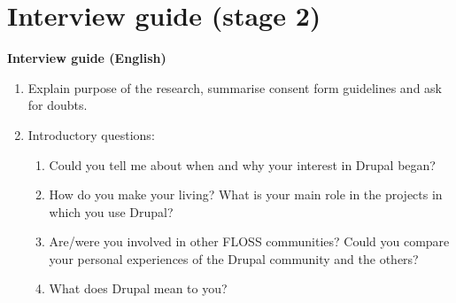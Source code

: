 \chapter{Interview guide (stage 2)}
\label{appendix-interview-guide-stage-2}

\newpage
	
\hrulefill\par

\begin{center}
\textbf{Interview guide (English)}
\end{center}

\begin{enumerate}
	\item Explain purpose of the research, summarise consent form guidelines and ask for doubts.
	\item Introductory questions:
		\begin{enumerate}
			\item Could you tell me about when and why your interest in Drupal began?
			\item How do you make your living? What is your main role in the projects in which you use Drupal?
			\item Are\slash were you involved in other FLOSS communities? Could you compare your personal experiences of the Drupal community and the others? 
			\item What does Drupal mean to you?
		\end{enumerate}
	

\end{enumerate}
